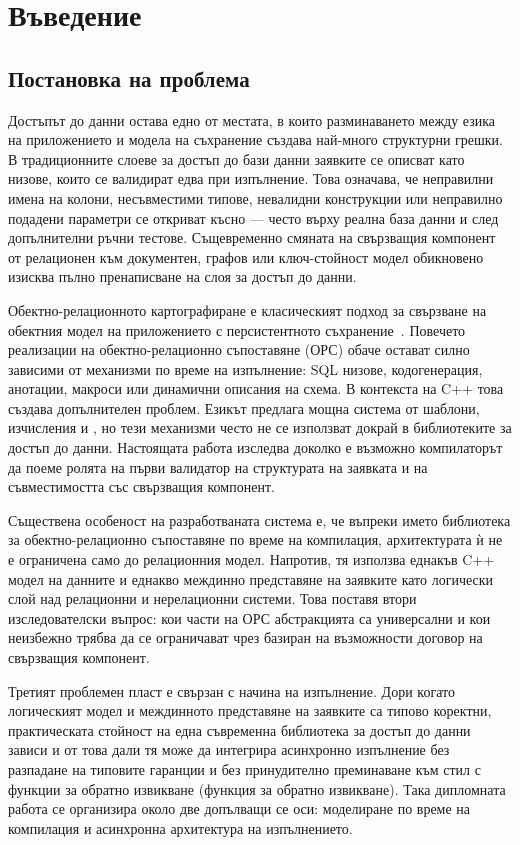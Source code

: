 \section{Въведение}
\label{sec:introduction}

\subsection{Постановка на проблема}

Достъпът до данни остава едно от местата, в които разминаването между езика на приложението и модела на съхранение създава най-много структурни грешки. В традиционните слоеве за достъп до бази данни заявките се описват като низове, които се валидират едва при изпълнение. Това означава, че неправилни имена на колони, несъвместими типове, невалидни  конструкции или неправилно подадени параметри се откриват късно --- често върху реална база данни и след допълнителни ръчни тестове. Същевременно смяната на свързващия компонент от релационен към документен, графов или ключ-стойност модел обикновено изисква пълно пренаписване на слоя за достъп до данни.

Обектно-релационното картографиране е класическият подход за свързване на обектния модел на приложението с персистентното съхранение~\cite{fowler2002}. Повечето реализации на обектно-релационно съпоставяне (ОРС) обаче остават силно зависими от механизми по време на изпълнение: SQL низове, кодогенерация, анотации, макроси или динамични описания на схема. В контекста на C++ това създава допълнителен проблем. Езикът предлага мощна система от шаблони,  изчисления и , но тези механизми често не се използват докрай в библиотеките за достъп до данни. Настоящата работа изследва доколко е възможно компилаторът да поеме ролята на първи валидатор на структурата на заявката и на съвместимостта със свързващия компонент.

Съществена особеност на разработваната система е, че въпреки името библиотека за обектно-релационно съпоставяне по време на компилация, архитектурата ѝ не е ограничена само до релационния модел. Напротив, тя използва еднакъв C++ модел на данните и еднакво междинно представяне на заявките като логически слой над релационни и нерелационни системи. Това поставя втори изследователски въпрос: кои части на ОРС абстракцията са универсални и кои неизбежно трябва да се ограничават чрез базиран на възможности договор на свързващия компонент.

Третият проблемен пласт е свързан с начина на изпълнение. Дори когато логическият модел и междинното представяне на заявките са типово коректни, практическата стойност на една съвременна библиотека за достъп до данни зависи и от това дали тя може да интегрира асинхронно изпълнение без разпадане на типовите гаранции и без принудително преминаване към стил с функции за обратно извикване (функция за обратно извикване). Така дипломната работа се организира около две допълващи се оси: моделиране по време на компилация и асинхронна архитектура на изпълнението.

